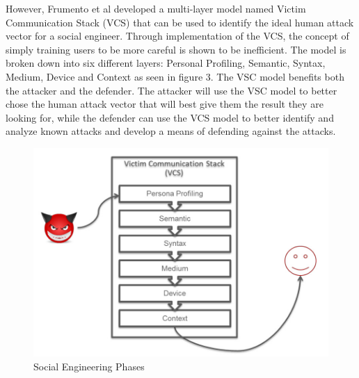 \documentclass[conference]{IEEEtran}
\begin{document}
However, Frumento et al developed a multi-layer model named Victim Communication Stack (VCS) that can be used to identify the ideal human attack vector for a social engineer\cite{Frumento:2017:VCS:3098954.3103156}. Through implementation of the VCS, the concept of simply training users to be more careful is shown to be inefficient. The model is broken down into six different layers: Personal Profiling, Semantic, Syntax, Medium, Device and Context as seen in figure 3\cite{Frumento:2017:VCS:3098954.3103156}. The VSC model benefits both the attacker and the defender.  The attacker will use the VSC model to better chose the human attack vector that will best give them the result they are looking for, while the defender can use the VCS model to better identify and analyze known attacks and develop a means of defending against the attacks\cite{Frumento:2017:VCS:3098954.3103156}. 
\begin{figure}[htbp]
\centerline{\includegraphics[scale= .25]{VSC.jpg}}
\caption{Social Engineering Phases \cite{Frumento:2017:VCS:3098954.3103156} }
\label{fig}
\end{figure}
\end{document}
